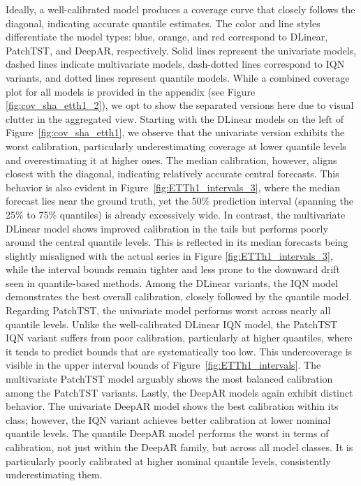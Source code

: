 \documentclass[a4paper,oneside,bibliography=totoc]{scrbook}
\begin{document}
Ideally, a well-calibrated model produces a coverage curve that closely follows the diagonal, indicating accurate quantile estimates.
The color and line styles differentiate the model types: blue, orange, and red correspond to DLinear, PatchTST, and DeepAR, respectively. Solid lines represent the univariate models, dashed lines indicate multivariate models, dash-dotted lines correspond to IQN variants, and dotted lines represent quantile models. 
While a combined coverage plot for all models is provided in the appendix (see Figure \ref{fig:cov_sha_etth1_2}), we opt to show the separated versions here due to visual clutter in the aggregated view.
Starting with the DLinear models on the left of Figure~\ref{fig:cov_sha_etth1}, we observe that the univariate version exhibits the worst calibration, particularly underestimating coverage at lower quantile levels and overestimating it at higher ones. The median calibration, however, aligns closest with the diagonal, indicating relatively accurate central forecasts. This behavior is also evident in Figure~\ref{fig:ETTh1_intervals_3}, where the median forecast lies near the ground truth, yet the 50\% prediction interval (spanning the 25\% to 75\% quantiles) is already excessively wide. 
In contrast, the multivariate DLinear model shows improved calibration in the tails but performs poorly around the central quantile levels. This is reflected in its median forecasts being slightly misaligned with the actual series in Figure \ref{fig:ETTh1_intervals_3}, while the interval bounds remain tighter and less prone to the downward drift seen in quantile-based methods. Among the DLinear variants, the IQN model demonstrates the best overall calibration, closely followed by the quantile model.
Regarding PatchTST, the univariate model performs worst across nearly all quantile levels. Unlike the well-calibrated DLinear IQN model, the PatchTST IQN variant suffers from poor calibration, particularly at higher quantiles, where it tends to predict bounds that are systematically too low. This undercoverage is visible in the upper interval bounds of Figure~\ref{fig:ETTh1_intervals}. The multivariate PatchTST model arguably shows the most balanced calibration among the PatchTST variants.
Lastly, the DeepAR models again exhibit distinct behavior. The univariate DeepAR model shows the best calibration within its class; however, the IQN variant achieves better calibration at lower nominal quantile levels.
The quantile DeepAR model performs the worst in terms of calibration, not just within the DeepAR family, but across all model classes. It is particularly poorly calibrated at higher nominal quantile levels, consistently underestimating them.
\end{document}
